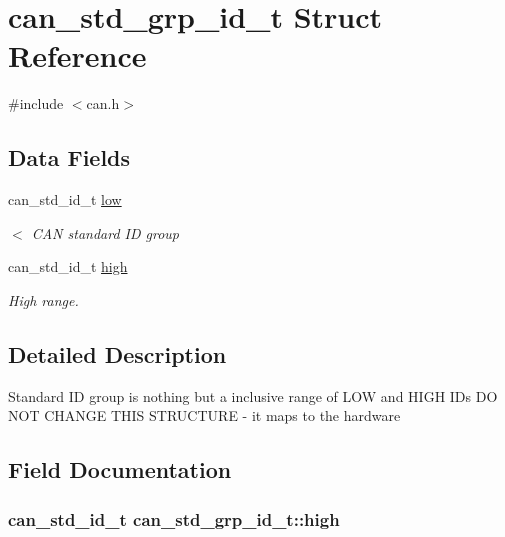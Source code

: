 \hypertarget{structcan__std__grp__id__t}{}\section{can\+\_\+std\+\_\+grp\+\_\+id\+\_\+t Struct Reference}
\label{structcan__std__grp__id__t}


{\ttfamily \#include $<$can.\+h$>$}

\subsection*{Data Fields}
\begin{DoxyCompactItemize}
\item 
can\+\_\+std\+\_\+id\+\_\+t \hyperlink{structcan__std__grp__id__t_aeb91d861e04959be79446296e0dcfecf}{low}
\begin{DoxyCompactList}\small\item\em $<$ C\+AN standard ID group \end{DoxyCompactList}\item 
can\+\_\+std\+\_\+id\+\_\+t \hyperlink{structcan__std__grp__id__t_af4a7dc1a8a79f94e16ecd156387d11b4}{high}
\begin{DoxyCompactList}\small\item\em High range. \end{DoxyCompactList}\end{DoxyCompactItemize}


\subsection{Detailed Description}
Standard ID group is nothing but a inclusive range of L\+OW and H\+I\+GH I\+Ds DO N\+OT C\+H\+A\+N\+GE T\+H\+IS S\+T\+R\+U\+C\+T\+U\+RE -\/ it maps to the hardware 

\subsection{Field Documentation}
\subsubsection[{\texorpdfstring{high}{high}}]{\setlength{\rightskip}{0pt plus 5cm}can\+\_\+std\+\_\+id\+\_\+t can\+\_\+std\+\_\+grp\+\_\+id\+\_\+t\+::high}\hypertarget{structcan__std__grp__id__t_af4a7dc1a8a79f94e16ecd156387d11b4}{}\label{structcan__std__grp__id__t_af4a7dc1a8a79f94e16ecd156387d11b4}


